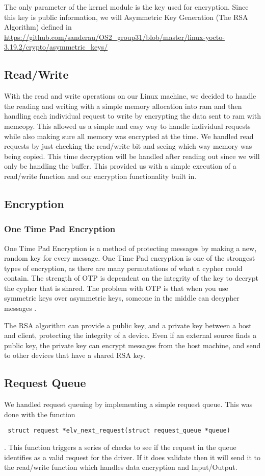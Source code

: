 \documentclass[onecolumn, draftclsnofoot,10pt, compsoc]{IEEEtran}
\begin{document}
    The only parameter of the kernel module is the key used for encryption. 
    Since this key is public information, we will Asymmetric Key Generation (The RSA Algorithm) defined in \url{https://github.com/sanderau/OS2_group31/blob/master/linux-yocto-3.19.2/crypto/asymmetric_keys/ }
        
	\subsection{Read/Write}
    With the read and write operations on our Linux machine, we decided to handle the reading and writing with a simple memory allocation into ram and then handling each individual request to write by encrypting the data sent to ram with memcopy. This allowed us a simple and easy way to handle individual requests while also making sure all memory was encrypted at the time. We handled read requests by just checking the read/write bit and seeing which way memory was being copied. This time decryption will be handled after reading out since we will only be handling the buffer. This provided us with a simple execution of a read/write function and our encryption functionality built in.

    \subsection{Encryption}
    \subsubsection{ One Time Pad Encryption }
        One Time Pad Encryption \cite{khanAcademy} is a method of protecting messages by making a new, random key for every message.
        One Time Pad encryption is one of the strongest types of encryption, as there are many permutations of what a cypher could contain. 
        The strength of OTP is dependent on the integrity of the key to decrypt the cypher that is shared. 
        The problem with OTP is that when you use symmetric keys over asymmetric keys, someone in the middle can decypher messages \cite{asymmetric}.

        The RSA algorithm can provide a public key, and a private key between a host and client, protecting the integrity of a device.
        Even if an external source finds a public key, the private key can encrypt messages from the host machine, and send to other devices that have a shared RSA key.
    
    \subsection{Request Queue}
    We handled request queuing by implementing a simple request queue. This was done with the function \begin{verbatim} struct request *elv_next_request(struct request_queue *queue) \end{verbatim}. This function triggers a series of checks to see if the request in the queue identifies as a valid request for the driver. If it does validate then it will send it to the read/write function which handles data encryption and Input/Output.
\end{document}

